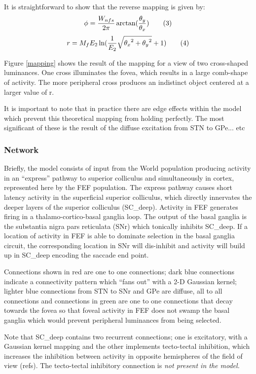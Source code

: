 \documentclass{frontiersSCNS}
\begin{document}
It is straightforward to show that the reverse mapping is given by:
\[
   \phi = {W_{nfs} \over 2 \pi}\arctan({\theta_y\over\theta_x}) \tag{3}
\]
\[
   r = M_f E_2 \ln ({1\over E_2}\sqrt{{\theta_x}^2 + {\theta_y}^2}+1) \tag{4}
\]

Figure \ref{mapping} shows the result of the mapping for a view of two
cross-shaped luminances. One cross illuminates the fovea, which
results in a large comb-shape of activity. The more peripheral cross
produces an indistinct object centered at a larger value of r.

It is important to note that in practice there are edge effects within
the model which prevent this theoretical mapping from holding
perfectly. The most significant of these is the result of the diffuse
excitation from STN to GPe... etc %

\subsubsection{Network}

Briefly, the model consists of input from the World population
producing activity in an ``express'' pathway to superior colliculus
and simultaneously in cortex, represented here by the FEF
population. The express pathway causes short latency activity in the
superficial superior colliculus, which directly innervates the deeper
layers of the superior colliculus (SC\_deep). Activity in FEF
generates firing in a thalamo-cortico-basal ganglia loop. The output
of the basal ganglia is the substantia nigra pars reticulata (SNr)
which tonically inhibits SC\_deep. If a location of activity in FEF is
able to dominate selection in the basal ganglia circuit, the
corresponding location in SNr will dis-inhibit and activity will build
up in SC\_deep encoding the saccade end point.

Connections shown in red are one to one connections; dark blue
connections indicate a connectivity pattern which ``fans out'' with a 2-D
Gaussian kernel; lighter blue connections from STN to SNr and GPe are
diffuse, all to all connections and connections in green are one to one
connections that decay towards the fovea so that foveal activity in
FEF does not swamp the basal ganglia which would prevent peripheral
luminances from being selected.

Note that SC\_deep contains two recurrent connections; one is
excitatory, with a Gaussian kernel mapping and the other implements
tecto-tectal inhibition, which increases the inhibition between
activity in opposite hemispheres of the field of view (refs). The
tecto-tectal inhibitory connection is \em{not} present in the \ccg
model.
\end{document}
